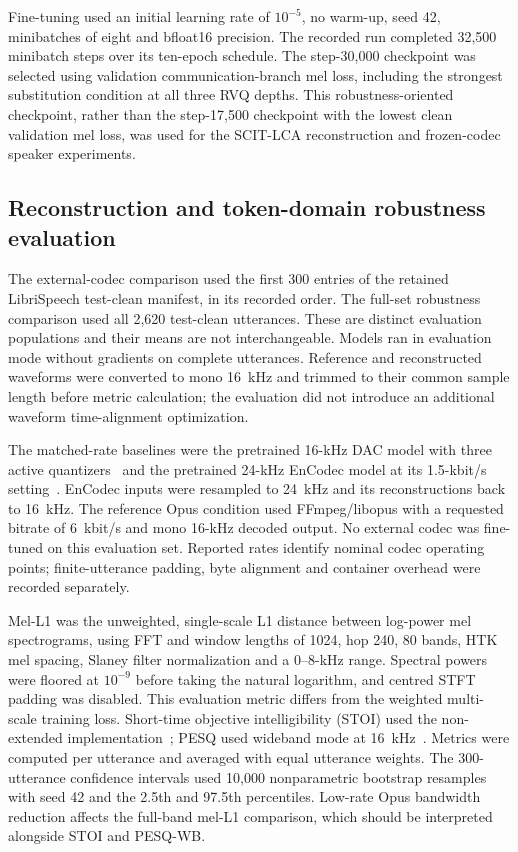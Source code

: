 \documentclass[final,5p,times,twocolumn]{elsarticle}
\begin{document}
Fine-tuning used an initial learning rate of $10^{-5}$, no warm-up, seed 42, minibatches of eight and bfloat16 precision. The recorded run completed 32,500 minibatch steps over its ten-epoch schedule. The step-30,000 checkpoint was selected using validation communication-branch mel loss, including the strongest substitution condition at all three RVQ depths. This robustness-oriented checkpoint, rather than the step-17,500 checkpoint with the lowest clean validation mel loss, was used for the SCIT-LCA reconstruction and frozen-codec speaker experiments.

\subsection{Reconstruction and token-domain robustness evaluation}
The external-codec comparison used the first 300 entries of the retained LibriSpeech test-clean manifest, in its recorded order. The full-set robustness comparison used all 2,620 test-clean utterances. These are distinct evaluation populations and their means are not interchangeable. Models ran in evaluation mode without gradients on complete utterances. Reference and reconstructed waveforms were converted to mono 16~kHz and trimmed to their common sample length before metric calculation; the evaluation did not introduce an additional waveform time-alignment optimization.

The matched-rate baselines were the pretrained 16-kHz DAC model with three active quantizers~\cite{dac} and the pretrained 24-kHz EnCodec model at its 1.5-kbit/s setting~\cite{encodec}. EnCodec inputs were resampled to 24~kHz and its reconstructions back to 16~kHz. The reference Opus condition used FFmpeg/libopus with a requested bitrate of 6~kbit/s and mono 16-kHz decoded output. No external codec was fine-tuned on this evaluation set. Reported rates identify nominal codec operating points; finite-utterance padding, byte alignment and container overhead were recorded separately.

Mel-L1 was the unweighted, single-scale L1 distance between log-power mel spectrograms, using FFT and window lengths of 1024, hop 240, 80 bands, HTK mel spacing, Slaney filter normalization and a 0--8-kHz range. Spectral powers were floored at $10^{-9}$ before taking the natural logarithm, and centred STFT padding was disabled. This evaluation metric differs from the weighted multi-scale training loss. Short-time objective intelligibility (STOI) used the non-extended implementation~\cite{stoi}; PESQ used wideband mode at 16~kHz~\cite{pesq}. Metrics were computed per utterance and averaged with equal utterance weights. The 300-utterance confidence intervals used 10,000 nonparametric bootstrap resamples with seed 42 and the 2.5th and 97.5th percentiles. Low-rate Opus bandwidth reduction affects the full-band mel-L1 comparison, which should be interpreted alongside STOI and PESQ-WB.
\end{document}
